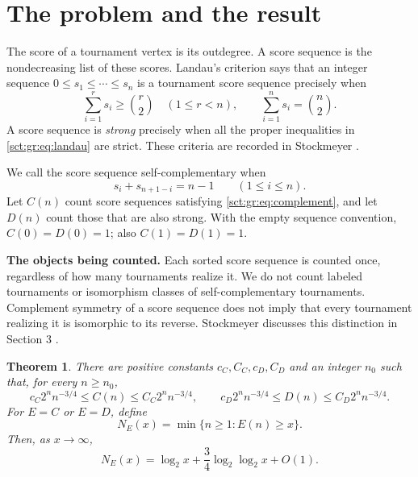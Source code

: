 \documentclass[11pt,letterpaper]{article}
\newtheorem{theorem}{Theorem}[section]
\theoremstyle{definition}\newtheorem{remark}[theorem]{Remark}
\begin{document}
\section{The problem and the result}\label{sct:gr:sec:problem}

The score of a tournament vertex is its outdegree. A score sequence is the
nondecreasing list of these scores. Landau's criterion says that an integer
sequence $0\le s_1\le\cdots\le s_n$ is a tournament score sequence precisely when
\begin{equation}\label{sct:gr:eq:landau}
 \sum_{i=1}^r s_i\ge \binom{r}{2}\quad(1\le r<n),
 \qquad \sum_{i=1}^n s_i=\binom{n}{2}.
\end{equation}
A score sequence is \emph{strong} precisely when all the proper inequalities
in \eqref{sct:gr:eq:landau} are strict. These criteria are recorded in Stockmeyer
\cite[Propositions 1 and 7]{stockmeyer}.

We call the score sequence self-complementary when
\begin{equation}\label{sct:gr:eq:complement}
 s_i+s_{n+1-i}=n-1\qquad(1\le i\le n).
\end{equation}
Let $C(n)$ count score sequences satisfying \eqref{sct:gr:eq:complement}, and let
$D(n)$ count those that are also strong. With the empty sequence convention,
$C(0)=D(0)=1$; also $C(1)=D(1)=1$.

\textbf{The objects being counted.}
Each sorted score sequence is counted once, regardless of how many tournaments
realize it. We do not count labeled tournaments or isomorphism classes of
self-complementary tournaments. Complement symmetry of a score sequence does
not imply that every tournament realizing it is isomorphic to its reverse.
Stockmeyer discusses this distinction in Section 3 \cite{stockmeyer}.

\begin{theorem}\label{sct:gr:thm:main}
There are positive constants $c_C,C_C,c_D,C_D$ and an integer $n_0$ such that,
for every $n\ge n_0$,
\[
 c_C2^n n^{-3/4}\le C(n)\le C_C2^n n^{-3/4},\qquad
 c_D2^n n^{-3/4}\le D(n)\le C_D2^n n^{-3/4}.
\]
For $E=C$ or $E=D$, define
\[
 N_E(x)=\min\{n\ge1:E(n)\ge x\}.
\]
Then, as $x\to\infty$,
\begin{equation}\label{sct:gr:eq:inverse}
 N_E(x)=\log_2 x+\frac34\log_2\log_2 x+O(1).
\end{equation}
\end{theorem}
\end{document}
